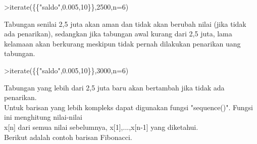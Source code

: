 \documentclass[12pt,Times new roman,letterpaper]{book}
\begin{document}
\begin{eulernootebook}
\begin{eulercomment}
\begin{eulercomment}
\begin{eulernootebook}
\begin{eulercomment}
\begin{eulercomment}
\begin{eulercomment}
\begin{eulercomment}
\begin{eulercomment}
\begin{eulercomment}
\begin{eulernotebook}
\begin{eulercomment}
\begin{eulercomment}
\begin{eulercomment}
\begin{eulercomment}
\begin{eulercomment}
\begin{eulercomment}
\begin{eulercomment}
\begin{eulercomment}
\begin{eulercomment}
\begin{eulercomment}
\begin{eulercomment}
\begin{eulercomment}
\begin{eulercomment}
\begin{eulercomment}
\begin{eulercomment}
\begin{eulercomment}
\begin{eulercomment}
\begin{eulercomment}
\begin{eulercomment}
\begin{eulercomment}
\begin{eulercomment}
\begin{eulercomment}
\begin{eulercomment}
\begin{eulercomment}
\begin{eulercomment}
\begin{eulercomment}
\begin{eulerprompt}
>iterate(\{\{"saldo",0.005,10\}\},2500,n=6)
\end{eulerprompt}
\begin{euleroutput}
  [2500,  2500,  2500,  2500,  2500,  2500,  2500]
\end{euleroutput}
\begin{eulercomment}
Tabungan senilai 2,5 juta akan aman dan tidak akan berubah nilai (jika
tidak ada penarikan), sedangkan jika tabungan awal kurang dari 2,5
juta, lama kelamaan akan berkurang meskipun tidak pernah dilakukan
penarikan uang tabungan.
\end{eulercomment}
\begin{eulerprompt}
>iterate(\{\{"saldo",0.005,10\}\},3000,n=6)
\end{eulerprompt}
\begin{euleroutput}
  [3000,  3002,  3004.01,  3006.03,  3008.05,  3010.08,  3012.12]
\end{euleroutput}
\begin{eulercomment}
Tabungan yang lebih dari 2,5 juta baru akan bertambah jika tidak ada
penarikan.\\
Untuk barisan yang lebih kompleks dapat digunakan fungsi "sequence()".
Fungsi ini menghitung nilai-nilai\\
x[n] dari semua nilai sebelumnya, x[1],...,x[n-1] yang diketahui.\\
Berikut adalah contoh barisan Fibonacci.


\end{eulercomment}
\end{eulercomment}
\end{eulercomment}
\end{eulercomment}
\end{eulercomment}
\end{eulercomment}
\end{eulercomment}
\end{eulercomment}
\end{eulercomment}
\end{eulercomment}
\end{eulercomment}
\end{eulercomment}
\end{eulercomment}
\end{eulercomment}
\end{eulercomment}
\end{eulercomment}
\end{eulercomment}
\end{eulercomment}
\end{eulercomment}
\end{eulercomment}
\end{eulercomment}
\end{eulercomment}
\end{eulercomment}
\end{eulercomment}
\end{eulercomment}
\end{eulercomment}
\end{eulercomment}
\end{eulernotebook}
\end{eulercomment}
\end{eulercomment}
\end{eulercomment}
\end{eulercomment}
\end{eulercomment}
\end{eulercomment}
\end{eulernootebook}
\end{eulercomment}
\end{eulercomment}
\end{eulernootebook}
\end{document}
